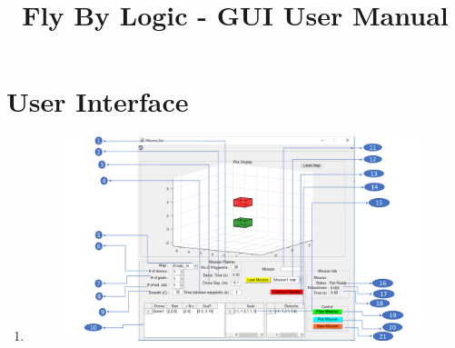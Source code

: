 \documentclass[english]{article}
\title{Fly By Logic - GUI User Manual}
\begin{document}
\maketitle

\section{User Interface}
\begin{enumerate}
    \item 
        \begin{figure}[H]
        \centering
        \includegraphics[scale=0.6]{layout.pdf}
    \end{figure}
\end{enumerate}
\end{document}
